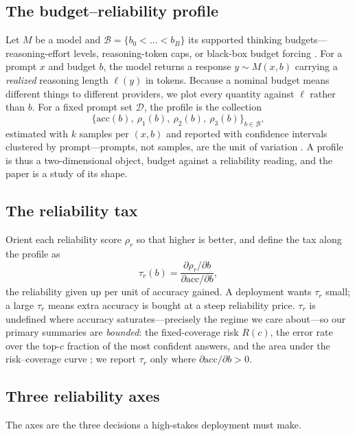 \documentclass[11pt]{article}
\begin{document}
\subsection{The budget--reliability profile}\label{sec:profile}
Let $M$ be a model and $\mathcal{B}=\{b_0<\dots<b_B\}$ its supported thinking
budgets---reasoning-effort levels, reasoning-token caps, or black-box budget
forcing \citep{Muennighoff2025s1}.
For a prompt $x$ and budget $b$, the model returns a response $y\sim M(x,b)$
carrying a \emph{realized} reasoning length $\ell(y)$ in tokens.
Because a nominal budget means different things to different providers, we plot
every quantity against $\ell$ rather than $b$.
For a fixed prompt set $\mathcal{D}$, the profile is the collection
\begin{equation}
\big\{\mathrm{acc}(b),\ \rho_1(b),\ \rho_2(b),\ \rho_3(b)\big\}_{b\in\mathcal{B}},
\end{equation}
estimated with $k$ samples per $(x,b)$ and reported with confidence intervals
clustered by prompt---prompts, not samples, are the unit of variation
\citep{Zhang2025BeyondSingular, Miller2024ErrorBars}.
A profile is thus a two-dimensional object, budget against a reliability
reading, and the paper is a study of its shape.

\subsection{The reliability tax}\label{sec:tax}
Orient each reliability score $\rho_r$ so that higher is better, and define the
tax along the profile as
\begin{equation}
\tau_r(b)=\frac{\partial \rho_r/\partial b}{\partial \mathrm{acc}/\partial b},
\end{equation}
the reliability given up per unit of accuracy gained.
A deployment wants $\tau_r$ small; a large $\tau_r$ means extra accuracy is
bought at a steep reliability price.
$\tau_r$ is undefined where accuracy saturates---precisely the regime we care
about---so our primary summaries are \emph{bounded}: the fixed-coverage risk
$R(c)$, the error rate over the top-$c$ fraction of the most confident
answers, and the area under the risk--coverage curve \citep{Geifman2017Selective};
we report $\tau_r$ only where $\partial\mathrm{acc}/\partial b>0$.

\subsection{Three reliability axes}\label{sec:axes}
The axes are the three decisions a high-stakes deployment must make.
\end{document}
